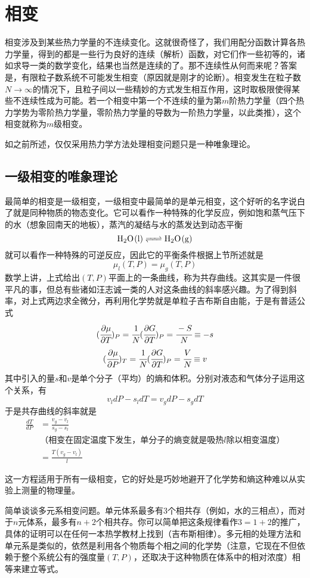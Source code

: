 \documentclass[a4paper,11pt]{ctexart}
\newcommand{\beq}{\begin{equation}}
\newcommand{\eeq}{\end{equation}}
\newcommand{\bea}{\begin{equation}\begin{aligned}}
\newcommand{\eea}{\end{aligned}\end{equation}}
\newcommand{\red}{\color{red}}
\begin{document}
\section{相变}
相变涉及到某些热力学量的不连续变化。这就很奇怪了，我们用配分函数计算各热力学量，得到的都是一些行为良好的连续（解析）函数，对它们作一些初等的，诸如求导一类的数学变化，结果也当然是连续的了。那不连续性从何而来呢？答案是，{\red 有限粒子数系统不可能发生相变}（原因就是刚才的论断）。相变发生在粒子数$N \to \infty$的情况下，且粒子间以一些精妙的方式发生相互作用，这时取极限使得某些不连续性成为可能。若一个相变中第一个不连续的量为第$m$阶热力学量（四个热力学势为零阶热力学量，零阶热力学量的导数为一阶热力学量，以此类推），这个相变就称为{\red $m$级相变}。
\par
如之前所述，仅仅采用热力学方法处理相变问题只是一种唯象理论。
\subsection{一级相变的唯象理论}
最简单的相变是一级相变，一级相变中最简单的是单元相变，这个好听的名字说白了就是同种物质的物态变化。它可以看作一种特殊的化学反应，例如饱和蒸气压下的水（想象回南天的地板），蒸汽的凝结与水的蒸发达到动态平衡
\beq
\ce{H2O(l) <=> H2O(g)}
\eeq
就可以看作一种特殊的可逆反应，因此它的平衡条件根据上节所述就是
\beq
\mu_l(T,P) = \mu_g(T,P)
\eeq
数学上讲，上式给出$(T,P)$平面上的一条曲线，称为共存曲线。这其实是一件很平凡的事，但总有些诸如汪志诚一类的人对这条曲线的斜率感兴趣。为了得到斜率，对上式两边求全微分，再利用化学势就是单粒子吉布斯自由能，于是有普适公式
\beq
(\cfrac{\partial \mu}{\partial T})_P = \cfrac{1}{N} (\cfrac{\partial G}{\partial T})_P = \cfrac{-S}{N} \equiv -s
\eeq
\beq(\cfrac{\partial \mu}{\partial P})_T = \cfrac{1}{N} (\cfrac{\partial G}{\partial T})_P = \cfrac{V}{N} \equiv v 
\eeq
其中引入的量$s$和$v$是单个分子（平均）的熵和体积。分别对液态和气体分子运用这个关系，有
\beq
v_l dP - s_l dT = v_g dP - s_g dT
\eeq
于是共存曲线的斜率就是
\bea
\frac{dT}{dP} &= \frac{v_g - v_l}{s_g - s_l} \\
&\text{（相变在固定温度下发生，单分子的熵变就是吸热$l$除以相变温度）} \\
&= \frac{T(v_g - v_l)}{l}
\eea
\par
这一方程适用于所有一级相变，它的好处是巧妙地避开了化学势和熵这种难以从实验上测量的物理量。
\par
简单谈谈多元系相变问题。单元体系最多有3个相共存（例如，水的三相点），{\red 而对于$n$元体系，最多有$n+2$个相共存}。你可以简单把这条规律看作$3 = 1+2$的推广，具体的证明可以在任何一本热学教材上找到（{\red 吉布斯相律}）。多元相的处理方法和单元系是类似的，依然是利用各个物质每个相之间的化学势（注意，它现在不但依赖于整个系统公有的强度量$(T,P)$，还取决于这种物质在体系中的相对浓度）相等来建立等式。
\end{document}
